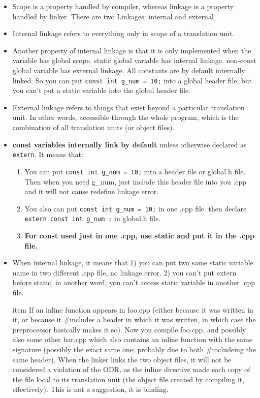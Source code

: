 \documentclass[a4paper,11pt,twoside]{book}
\begin{document}
\begin{itemize}
	\item Scope is a property handled by compiler, whereas linkage is a property handled by linker. There are two Linkages: internal and external
	
	\item Internal linkage refers to everything only in scope of a translation unit.
	
	\item Another property of internal linkage is that it is only implemented when the variable has global scope. static global variable has internal linkage. non-const global variable has external linkage. All constants are by default internally linked. So you can put \texttt{const int g\_num = 10;} into a global header file, but you can't put a static variable into the global header file.
	
	\item External linkage refers to things that exist beyond a particular translation unit. In other words, accessible through the whole program, which is the combination of all translation units (or object files).
	


	\item \textbf{const variables internally link by default} unless otherwise declared as \texttt{extern}. It means that:
	
	\begin{enumerate}
		\item You can put \texttt{const int g\_num = 10;} into a header file or global.h file. Then when you need g\_num, just include this header file into you .cpp and it will not cause redefine linkage error.
		
		\item You also can put \texttt{const int g\_num = 10;} in one .cpp file. then declare \texttt{extern const int g\_num ;} in global.h file.
		
		\item \textbf{For const used just in one .cpp, use static and put it in the .cpp file.}
	\end{enumerate}
	
	\item When internal linkage, it means that 1) you can put two same static variable name in two different .cpp file, no linkage error. 2) you can't put extern before static, in another word, you can't access static variable in another .cpp file. 
	
	item  If an inline function appears in foo.cpp (either because it was written in it, or because it \#includes a header in which it was written, in which case the preprocessor basically makes it so). Now you compile foo.cpp, and possibly also some other bar.cpp which also contains an inline function with the same signature (possibly the exact same one; probably due to both \#includeing the same header). When the linker links the two object files, it will not be considered a violation of the ODR, as the inline directive made each copy of the file local to its translation unit (the object file created by compiling it, effectively). This is not a suggestion, it is binding.
	

\end{itemize}
\end{document}
